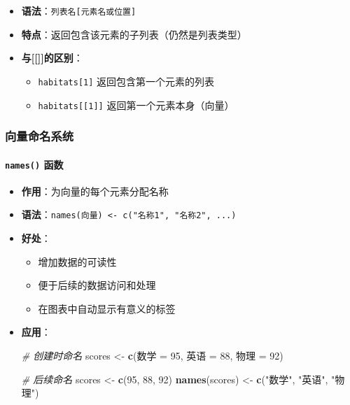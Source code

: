 \documentclass[
  twoside]{book}
\newenvironment{Shaded}{\begin{snugshade}}{\end{snugshade}}
\newcommand{\CommentTok}[1]{\textcolor[rgb]{0.56,0.35,0.01}{\textit{#1}}}
\newcommand{\DecValTok}[1]{\textcolor[rgb]{0.00,0.00,0.81}{#1}}
\newcommand{\FunctionTok}[1]{\textcolor[rgb]{0.13,0.29,0.53}{\textbf{#1}}}
\newcommand{\NormalTok}[1]{#1}
\newcommand{\OtherTok}[1]{\textcolor[rgb]{0.56,0.35,0.01}{#1}}
\newcommand{\StringTok}[1]{\textcolor[rgb]{0.31,0.60,0.02}{#1}}
\providecommand{\tightlist}{%
  \setlength{\itemsep}{0pt}\setlength{\parskip}{0pt}}
\begin{document}
\begin{itemize}
\tightlist
\item
  \textbf{语法}：\texttt{列表名{[}元素名或位置{]}}
\item
  \textbf{特点}：返回包含该元素的子列表（仍然是列表类型）
\item
  \textbf{与{[}{[}{]}{]}的区别}：

  \begin{itemize}
  \tightlist
  \item
    \texttt{habitats{[}1{]}} 返回包含第一个元素的列表
  \item
    \texttt{habitats{[}{[}1{]}{]}} 返回第一个元素本身（向量）
  \end{itemize}
\end{itemize}

\hypertarget{ux5411ux91cfux547dux540dux7cfbux7edf}{%
\subsubsection{向量命名系统}\label{ux5411ux91cfux547dux540dux7cfbux7edf}}

\hypertarget{names-ux51fdux6570}{%
\paragraph{\texorpdfstring{\texttt{names()} 函数}{names() 函数}}\label{names-ux51fdux6570}}

\begin{itemize}
\item
  \textbf{作用}：为向量的每个元素分配名称
\item
  \textbf{语法}：\texttt{names(向量)\ \textless{}-\ c("名称1",\ "名称2",\ ...)}
\item
  \textbf{好处}：

  \begin{itemize}
  \tightlist
  \item
    增加数据的可读性
  \item
    便于后续的数据访问和处理
  \item
    在图表中自动显示有意义的标签
  \end{itemize}
\item
  \textbf{应用}：

\begin{Shaded}
\begin{Highlighting}[]
\CommentTok{\# 创建时命名}
\NormalTok{scores }\OtherTok{\textless{}{-}} \FunctionTok{c}\NormalTok{(数学 }\OtherTok{=} \DecValTok{95}\NormalTok{, 英语 }\OtherTok{=} \DecValTok{88}\NormalTok{, 物理 }\OtherTok{=} \DecValTok{92}\NormalTok{)}

\CommentTok{\# 后续命名}
\NormalTok{scores }\OtherTok{\textless{}{-}} \FunctionTok{c}\NormalTok{(}\DecValTok{95}\NormalTok{, }\DecValTok{88}\NormalTok{, }\DecValTok{92}\NormalTok{)}
\FunctionTok{names}\NormalTok{(scores) }\OtherTok{\textless{}{-}} \FunctionTok{c}\NormalTok{(}\StringTok{"数学"}\NormalTok{, }\StringTok{"英语"}\NormalTok{, }\StringTok{"物理"}\NormalTok{)}
\end{Highlighting}
\end{Shaded}
\end{itemize}
\end{document}
